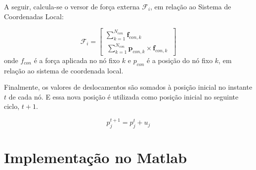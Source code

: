  A seguir, calcula-se o versor de força externa $\mathcal{F}_i$, em relação ao Sistema de Coordenadas Local:

\begin{equation} \label{eq:externalforcetorque}
\pmb{\mathcal{F}}_i
=  \begin{bmatrix}
        \sum_{k=1}^{N_{con}} \pmb{f}_{con,k} \\[1em]
        \ \sum_{k=1}^{N_{con}} \pmb{p}_{con,k}\times \pmb{f}_{con,k} \ 
     \end{bmatrix}
\end{equation}
onde $f_{con}$ é a força aplicada no nó fixo $k$ e $p_{con}$ é a posição do nó fixo $k$, em relação ao sistema de coordenada local.

Finalmente, os valores de deslocamentos são somados à posição inicial no instante $t$ de cada nó. E essa nova posição é utilizada como posição inicial no seguinte ciclo, $t+1$.

\begin{equation} \label{eq:newposition}
    p^{t+1}_{j} = p^{t}_{j} + u_{j}
\end{equation}

\section{Implementação no Matlab}

